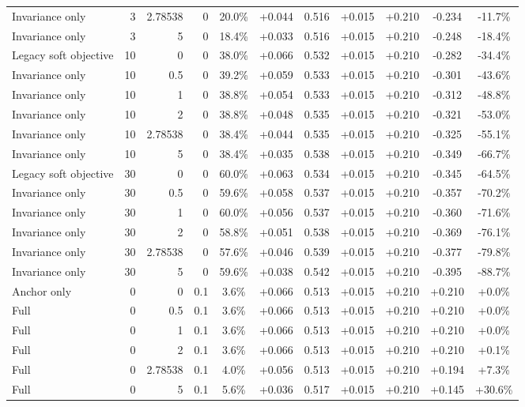 \begin{table}[htbp]
\begin{tabular}{lrrrccccccc}
Invariance only & 3 & 2.78538 & 0 & 20.0\% & +0.044 & 0.516 & +0.015 & +0.210 & -0.234 & -11.7\% \\
Invariance only & 3 & 5 & 0 & 18.4\% & +0.033 & 0.516 & +0.015 & +0.210 & -0.248 & -18.4\% \\
Legacy soft objective & 10 & 0 & 0 & 38.0\% & +0.066 & 0.532 & +0.015 & +0.210 & -0.282 & -34.4\% \\
Invariance only & 10 & 0.5 & 0 & 39.2\% & +0.059 & 0.533 & +0.015 & +0.210 & -0.301 & -43.6\% \\
Invariance only & 10 & 1 & 0 & 38.8\% & +0.054 & 0.533 & +0.015 & +0.210 & -0.312 & -48.8\% \\
Invariance only & 10 & 2 & 0 & 38.8\% & +0.048 & 0.535 & +0.015 & +0.210 & -0.321 & -53.0\% \\
Invariance only & 10 & 2.78538 & 0 & 38.4\% & +0.044 & 0.535 & +0.015 & +0.210 & -0.325 & -55.1\% \\
Invariance only & 10 & 5 & 0 & 38.4\% & +0.035 & 0.538 & +0.015 & +0.210 & -0.349 & -66.7\% \\
Legacy soft objective & 30 & 0 & 0 & 60.0\% & +0.063 & 0.534 & +0.015 & +0.210 & -0.345 & -64.5\% \\
Invariance only & 30 & 0.5 & 0 & 59.6\% & +0.058 & 0.537 & +0.015 & +0.210 & -0.357 & -70.2\% \\
Invariance only & 30 & 1 & 0 & 60.0\% & +0.056 & 0.537 & +0.015 & +0.210 & -0.360 & -71.6\% \\
Invariance only & 30 & 2 & 0 & 58.8\% & +0.051 & 0.538 & +0.015 & +0.210 & -0.369 & -76.1\% \\
Invariance only & 30 & 2.78538 & 0 & 57.6\% & +0.046 & 0.539 & +0.015 & +0.210 & -0.377 & -79.8\% \\
Invariance only & 30 & 5 & 0 & 59.6\% & +0.038 & 0.542 & +0.015 & +0.210 & -0.395 & -88.7\% \\
Anchor only & 0 & 0 & 0.1 & 3.6\% & +0.066 & 0.513 & +0.015 & +0.210 & +0.210 & +0.0\% \\
Full & 0 & 0.5 & 0.1 & 3.6\% & +0.066 & 0.513 & +0.015 & +0.210 & +0.210 & +0.0\% \\
Full & 0 & 1 & 0.1 & 3.6\% & +0.066 & 0.513 & +0.015 & +0.210 & +0.210 & +0.0\% \\
Full & 0 & 2 & 0.1 & 3.6\% & +0.066 & 0.513 & +0.015 & +0.210 & +0.210 & +0.1\% \\
Full & 0 & 2.78538 & 0.1 & 4.0\% & +0.056 & 0.513 & +0.015 & +0.210 & +0.194 & +7.3\% \\
Full & 0 & 5 & 0.1 & 5.6\% & +0.036 & 0.517 & +0.015 & +0.210 & +0.145 & +30.6\% \\

\end{tabular}
\end{table}
